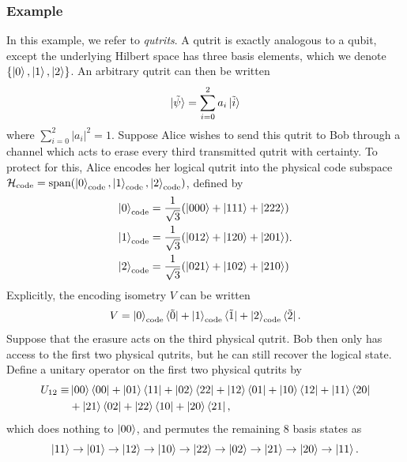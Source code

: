 \documentclass[12pt,a4paper]{report}
\numberwithin{equation}{section}
\newcommand{\ketbra}[2]{\ket{#1}\bra{#2}}
\newcommand{\ketbras}[1]{\ketbra{#1}{#1}}
\newcommand{\Hcode}{\mathcal{H}_{\text{code}}}
\theoremstyle{definition}
\theoremstyle{theorem}
\theoremstyle{theorem}
\theoremstyle{example}
\theoremstyle{definition}
\begin{document}
\subsubsection{Example}
In this example, we refer to \textit{qutrits}. A qutrit is exactly analogous to a qubit, except the underlying Hilbert space has three basis elements, which we denote $\{\ket{0},\ket{1},\ket{2}\}$. An arbitrary qutrit can then be written
\begin{equation}
	\ket{\tilde{\psi}}=\sum_{i=0}^{2}a_{i}\ket{\tilde{i}}
\end{equation}
where $\sum_{i=0}^{2}|a_{i}|^{2}=1$. Suppose Alice wishes to send this qutrit to Bob through a channel which acts to erase every third transmitted qutrit with certainty. To protect for this, Alice encodes her logical qutrit into the physical code subspace $\Hcode=\text{span}(\ket{0}_{\text{code}},\ket{1}_{\text{code}},\ket{2}_{\text{code}})$, defined by
\begin{equation}
	\begin{aligned}
		\ket{0}_{\text{code}}&=\frac{1}{\sqrt{3}}(\ket{{000}}+\ket{{111}}+\ket{{222}})\\
		\ket{1}_{\text{code}}&=\frac{1}{\sqrt{3}}(\ket{{012}}+\ket{{120}}+\ket{{201}})\\
		\ket{2}_{\text{code}}&=\frac{1}{\sqrt{3}}(\ket{{021}}+\ket{{102}}+\ket{{210}})
	\end{aligned}.
\end{equation}
Explicitly, the encoding isometry $V$ can be written
\begin{equation}
	V=\ket{0}_{\text{code}}\bra{\tilde{0}}+\ket{1}_{\text{code}}\bra{\tilde{1}}+\ket{2}_{\text{code}}\bra{\tilde{2}}.
\end{equation}
Suppose that the erasure acts on the third physical qutrit. Bob then only has access to the first two physical qutrits, but he can still recover the logical state. Define a unitary operator on the first two physical qutrits by
\begin{equation}\label{unitary}
	\begin{aligned}
		U_{12}\equiv&\ketbras{{00}}+\ketbra{{01}}{{11}}+\ketbra{{02}}{{22}}+\ketbra{{12}}{{01}}+\ketbra{{10}}{{12}}+\ketbra{{11}}{{20}}\\&+\ketbra{{21}}{{02}}+\ketbra{{22}}{{10}}+\ketbra{{20}}{{21}},
	\end{aligned}
\end{equation}
which does nothing to $\ket{{00}}$, and permutes the remaining 8 basis states as
\begin{equation}
	\ket{{11}}\to\ket{{01}}\to\ket{{12}}\to\ket{{10}}\to\ket{{22}}\to\ket{{02}}\to\ket{{21}}\to\ket{{20}}\to\ket{{11}}.
\end{equation}
\end{document}
